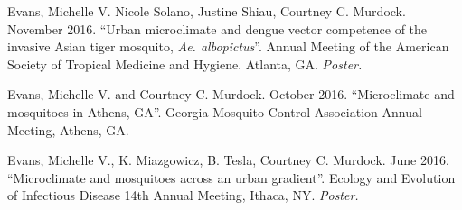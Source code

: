 \begin{cvitems}
	\item Evans, Michelle V. Nicole Solano, Justine Shiau, Courtney C. Murdock. November 2016. ``Urban microclimate and dengue vector competence of the invasive Asian tiger mosquito, \textit{Ae. albopictus}''. Annual Meeting of the American Society of Tropical Medicine and Hygiene. Atlanta, GA. \textit{Poster.}

	\item Evans, Michelle V. and Courtney C. Murdock. October 2016. ``Microclimate and mosquitoes in Athens, GA''. Georgia Mosquito Control Association Annual Meeting, Athens, GA.

	\item Evans, Michelle V., K. Miazgowicz, B. Tesla, Courtney C. Murdock. June 2016. ``Microclimate and mosquitoes across an urban gradient''. Ecology and Evolution of Infectious Disease 14th Annual Meeting, Ithaca, NY. \textit{Poster.}


	\bigskip
\end{cvitems}
